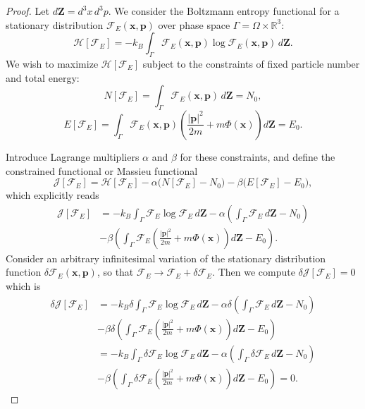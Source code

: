 \documentclass[12pt,a4paper]{article}
\numberwithin{equation}{section}
\begin{document}
\begin{proof}
Let $d\mathbf{Z}=d^{3}x\,d^{3}p$. We consider the Boltzmann entropy functional for a stationary distribution $\mathcal{F}_{E}(\mathbf{x},\mathbf{p})$ over phase space $\Gamma = \Omega \times \mathbb{R}^3$:
\[
\mathcal{H}[\mathcal{F}_{E}] = - k_B \int_\Gamma \mathcal{F}_{E}(\mathbf{x},\mathbf{p}) \log \mathcal{F}_{E}(\mathbf{x},\mathbf{p}) \, d\mathbf{Z}.
\]
We wish to maximize $\mathcal{H}[\mathcal{F}_{E}]$ subject to the constraints of fixed particle number and total energy:
\[
N[\mathcal{F}_{E}] = \int_\Gamma \mathcal{F}_{E}(\mathbf{x},\mathbf{p}) \, d\mathbf{Z} = N_0,
\]
\[
E[\mathcal{F}_{E}] = \int_\Gamma \mathcal{F}_{E}(\mathbf{x},\mathbf{p}) \left( \frac{|\mathbf{p}|^2}{2m} + m \Phi(\mathbf{x}) \right) d\mathbf{Z} = E_0.
\]

Introduce Lagrange multipliers $\alpha$ and $\beta$ for these constraints, and define the constrained functional or Massieu functional
\[
\mathcal{J}[\mathcal{F}_{E}] = \mathcal{H}[\mathcal{F}_{E}] - \alpha \big(N[\mathcal{F}_{E}] - N_0\big) - \beta \big(E[\mathcal{F}_{E}] - E_0\big),
\]
which explicitly reads
\begin{align}
\mathcal{J} [\mathcal{F}_{E}]& = - k_B \int_\Gamma \mathcal{F}_{E} \log \mathcal{F}_{E} \, d\mathbf{Z}
- \alpha \left( \int_\Gamma \mathcal{F}_{E} \, d\mathbf{Z} - N_0 \right)\nonumber\\&
- \beta \left( \int_\Gamma \mathcal{F}_{E} \left( \frac{|\mathbf{p}|^2}{2m} + m \Phi(\mathbf{x}) \right) d\mathbf{Z} - E_0 \right).
\end{align}
Consider an arbitrary infinitesimal variation of the stationary distribution function $\delta \mathcal{F}_{E}(\mathbf{x},\mathbf{p})$, so that $\mathcal{F}_{E} \to \mathcal{F}_{E} + \delta \mathcal{F}_{E}$. Then we compute $\delta \mathcal{J}[\mathcal{F}_{E}]=0$ which is
\begin{align}
\delta \mathcal{J}[\mathcal{F}_{E}]& = - k_B \delta \int_\Gamma \mathcal{F}_{E} \log \mathcal{F}_{E} \, d\mathbf{Z}
- \alpha \delta\left( \int_\Gamma \mathcal{F}_{E} \, d\mathbf{Z} - N_0 \right)\nonumber\\&
- \beta \delta \left( \int_\Gamma \mathcal{F}_{E} \left( \frac{|\mathbf{p}|^2}{2m} + m \Phi(\mathbf{x}) \right) d\mathbf{Z} - E_0 \right)\nonumber\\&
= - k_B \int_\Gamma \delta\mathcal{F}_{E} \log \mathcal{F}_{E} \, d\mathbf{Z}
- \alpha \left( \int_\Gamma \delta \mathcal{F}_{E} \, d\mathbf{Z} - N_0 \right)\nonumber\\&
- \beta \left( \int_\Gamma \delta \mathcal{F}_{E} \left( \frac{|\mathbf{p}|^2}{2m} + m \Phi(\mathbf{x}) \right) d\mathbf{Z} - E_0 \right)=0.

\end{align}
\end{proof}
\end{document}
